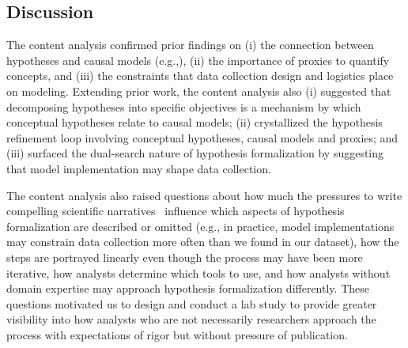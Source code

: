 \subsection{Discussion}
The content analysis confirmed prior findings on (i) the connection between
hypotheses and causal models (e.g.,\cite{mcelreath2020statistical}), (ii) the
importance of proxies to quantify concepts, and (iii) the constraints that data
collection design and logistics place on modeling. Extending prior work, the
content analysis also (i) suggested that decomposing hypotheses into specific
objectives is a mechanism by which conceptual hypotheses relate to causal
models; (ii) crystallized the hypothesis refinement loop involving conceptual
hypotheses, causal models and proxies; and (iii) surfaced the dual-search nature
of hypothesis formalization by suggesting that model implementation may shape
data collection. 


The content analysis also raised questions about how much the pressures to write
compelling scientific narratives~\cite{kerr1998harking} influence which aspects
of hypothesis formalization are described or omitted (e.g., in practice, model
implementations may constrain data collection more often than we found in our
dataset), how the steps are portrayed linearly even though the process may have been more iterative, how analysts determine
which tools to use, and how analysts without domain expertise may approach hypothesis formalization differently. These questions motivated us to design and conduct a lab
study to provide greater visibility into how analysts who are not necessarily
researchers approach the process with expectations of rigor but without pressure
of publication. 

